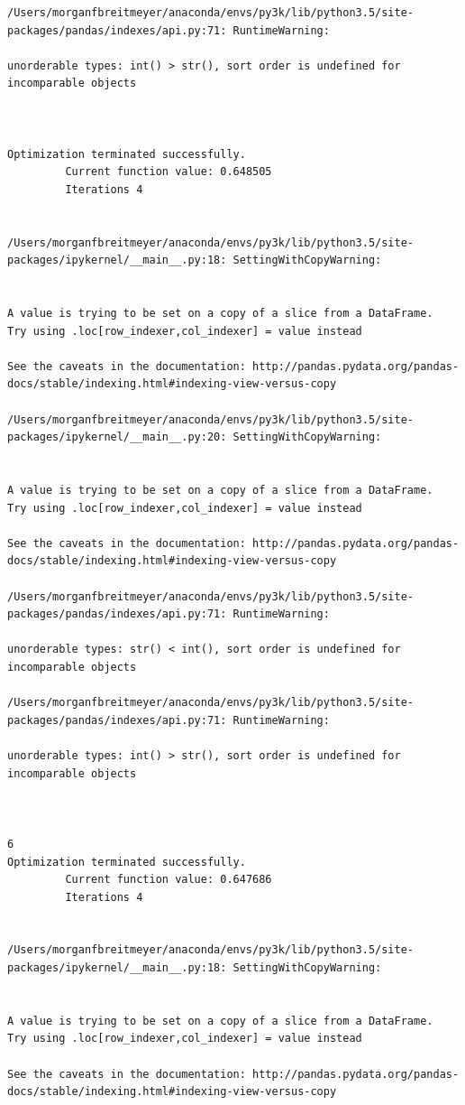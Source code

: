 \begin{lstlisting}
/Users/morganfbreitmeyer/anaconda/envs/py3k/lib/python3.5/site-packages/pandas/indexes/api.py:71: RuntimeWarning:

unorderable types: int() > str(), sort order is undefined for incomparable objects



Optimization terminated successfully.
         Current function value: 0.648505
         Iterations 4


/Users/morganfbreitmeyer/anaconda/envs/py3k/lib/python3.5/site-packages/ipykernel/__main__.py:18: SettingWithCopyWarning:


A value is trying to be set on a copy of a slice from a DataFrame.
Try using .loc[row_indexer,col_indexer] = value instead

See the caveats in the documentation: http://pandas.pydata.org/pandas-docs/stable/indexing.html#indexing-view-versus-copy

/Users/morganfbreitmeyer/anaconda/envs/py3k/lib/python3.5/site-packages/ipykernel/__main__.py:20: SettingWithCopyWarning:


A value is trying to be set on a copy of a slice from a DataFrame.
Try using .loc[row_indexer,col_indexer] = value instead

See the caveats in the documentation: http://pandas.pydata.org/pandas-docs/stable/indexing.html#indexing-view-versus-copy

/Users/morganfbreitmeyer/anaconda/envs/py3k/lib/python3.5/site-packages/pandas/indexes/api.py:71: RuntimeWarning:

unorderable types: str() < int(), sort order is undefined for incomparable objects

/Users/morganfbreitmeyer/anaconda/envs/py3k/lib/python3.5/site-packages/pandas/indexes/api.py:71: RuntimeWarning:

unorderable types: int() > str(), sort order is undefined for incomparable objects



6
Optimization terminated successfully.
         Current function value: 0.647686
         Iterations 4


/Users/morganfbreitmeyer/anaconda/envs/py3k/lib/python3.5/site-packages/ipykernel/__main__.py:18: SettingWithCopyWarning:


A value is trying to be set on a copy of a slice from a DataFrame.
Try using .loc[row_indexer,col_indexer] = value instead

See the caveats in the documentation: http://pandas.pydata.org/pandas-docs/stable/indexing.html#indexing-view-versus-copy


\end{lstlisting}

